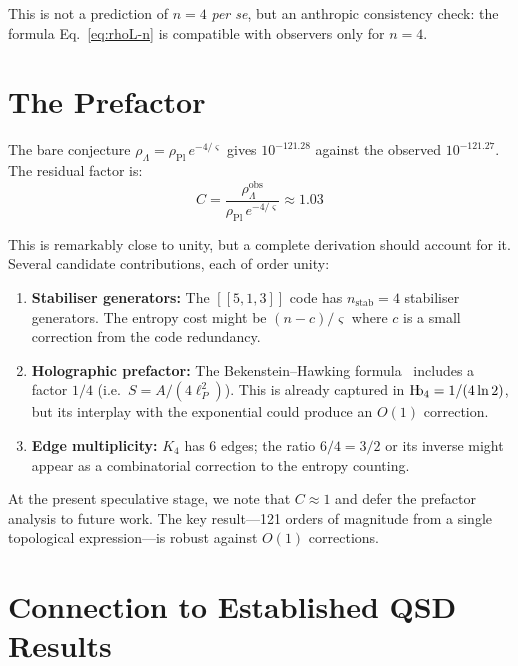 \documentclass[11pt,a4paper]{article}
\theoremstyle{definition}
\newcommand{\Hb}{\textnormal{H\kern-0.3em b}}
\newcommand{\Hbfour}{\Hb_4}
\newcommand{\strain}{\varsigma}            %
\newcommand{\rhoL}{\rho_{\Lambda}}
\newcommand{\rhoPl}{\rho_{\text{Pl}}}
\begin{document}
This is not a prediction of $n = 4$ \textit{per se}, but an anthropic consistency check: the formula Eq.~\eqref{eq:rhoL-n} is compatible with observers only for $n = 4$.


\section{The Prefactor}

The bare conjecture $\rhoL = \rhoPl\,e^{-4/\strain}$ gives $10^{-121.28}$ against the observed $10^{-121.27}$. The residual factor is:
\begin{equation}
    C = \frac{\rhoL^{\text{obs}}}{\rhoPl \, e^{-4/\strain}} \approx 1.03
\end{equation}

This is remarkably close to unity, but a complete derivation should account for it. Several candidate contributions, each of order unity:

\begin{enumerate}[nosep]
    \item \textbf{Stabiliser generators:} The $[[5,1,3]]$ code has $n_{\text{stab}} = 4$ stabiliser generators. The entropy cost might be $(n - c)/\strain$ where $c$ is a small correction from the code redundancy.
    \item \textbf{Holographic prefactor:} The Bekenstein--Hawking formula~\cite{Bekenstein1973} includes a factor $1/4$ (i.e.\ $S = A/(4\ell_P^2)$). This is already captured in $\Hbfour = 1/(4\ln 2)$, but its interplay with the exponential could produce an $O(1)$ correction.
    \item \textbf{Edge multiplicity:} $K_4$ has 6 edges; the ratio $6/4 = 3/2$ or its inverse might appear as a combinatorial correction to the entropy counting.
\end{enumerate}

At the present speculative stage, we note that $C \approx 1$ and defer the prefactor analysis to future work. The key result---121 orders of magnitude from a single topological expression---is robust against $O(1)$ corrections.


\section{Connection to Established QSD Results}
\end{document}
